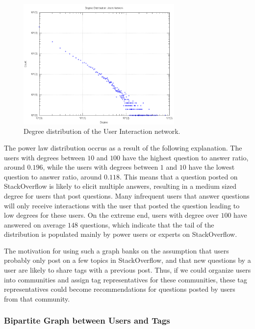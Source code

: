 \documentclass[11pt]{IEEEtran}
\begin{document}
\begin{figure}[h]
  \centering
    \includegraphics[width=3.2in]{user_degdistr.png}
  \caption{Degree distribution of the User Interaction network.}
  \label{fig:user_dd}
\end{figure}

The power law distribution occrus as a result of the following explanation. The users with degrees between $10$ and $100$ have the highest question to answer ratio, around $0.196$, while the users with degrees between $1$ and $10$ have the lowest question to answer ratio, around $0.118$. This means that a question posted on StackOverflow is likely to elicit multiple answers, resulting in a medium sized degree for users that post questions. Many infrequent users that answer questions will only receive interactions with the user that posted the question leading to low degrees for these users. On the extreme end, users with degree over $100$ have answered on average $148$ questions, which indicate that the tail of the distribution is populated mainly by power users or experts on StackOverflow.

The motivation for using such a graph banks on the assumption that users probably only post on a few topics in StackOverflow, and that new questions by a user are likely to share tags with a previous post. Thus, if we could organize users into communities and assign tag representatives for these communities, these tag representatives could become recommendations for questions posted by users from that community.


\subsubsection{Bipartite Graph between Users and Tags}
\end{document}
